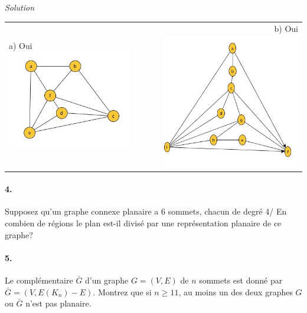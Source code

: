\textit{Solution}

\begin{tabular}{lcr}
a) Oui
\includegraphics[scale=.4]{ape9_ex3_a_2.jpg}
& $\qquad$ & b) Oui \includegraphics[scale=.4]{ape9_ex3_b_2.jpg}
\end{tabular}

\paragraph{4. }Supposez qu'un graphe connexe planaire a 6 sommets, chacun de degré 4/ En combien de régions le plan est-il divisé par une représentation planaire de ce graphe?

\paragraph{5. }Le complémentaire $\bar{G}$ d'un graphe $G = (V,E)$ de $n$ sommets est donné par $\bar{G} = (V, E(K_n)-E)$. Montrez que si $n \geq 11$, au moins un des deux graphes $G$ ou $\bar{G}$ n'est pas planaire.

